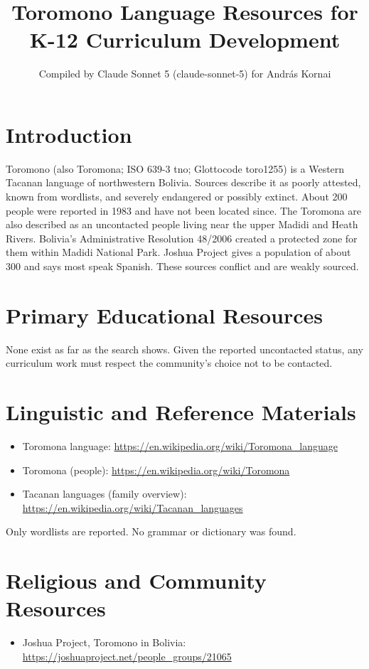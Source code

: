 \documentclass[12pt]{article}
\title{Toromono Language Resources for K-12 Curriculum Development}
\author{Compiled by Claude Sonnet 5 (claude-sonnet-5) for Andr\'as Kornai}
\date{}
\begin{document}
\maketitle

\section{Introduction}
Toromono (also Toromona; ISO 639-3 tno; Glottocode toro1255) is a Western Tacanan language of northwestern Bolivia. Sources describe it as poorly attested, known from wordlists, and severely endangered or possibly extinct. About 200 people were reported in 1983 and have not been located since. The Toromona are also described as an uncontacted people living near the upper Madidi and Heath Rivers. Bolivia's Administrative Resolution 48/2006 created a protected zone for them within Madidi National Park. Joshua Project gives a population of about 300 and says most speak Spanish. These sources conflict and are weakly sourced.

\section{Primary Educational Resources}
None exist as far as the search shows. Given the reported uncontacted status, any curriculum work must respect the community's choice not to be contacted.

\section{Linguistic and Reference Materials}
\begin{itemize}
\item Toromona language: \url{https://en.wikipedia.org/wiki/Toromona_language}
\item Toromona (people): \url{https://en.wikipedia.org/wiki/Toromona}
\item Tacanan languages (family overview): \url{https://en.wikipedia.org/wiki/Tacanan_languages}
\end{itemize}
Only wordlists are reported. No grammar or dictionary was found.

\section{Religious and Community Resources}
\begin{itemize}
\item Joshua Project, Toromono in Bolivia: \url{https://joshuaproject.net/people_groups/21065}
\end{itemize}
\end{document}
